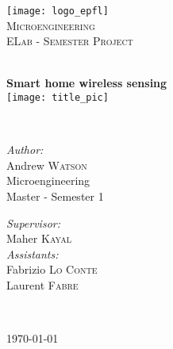 


\begin{titlepage}
\nocite{*}      %
  \begin{center}
     
     
    \texttt{[image: logo\_epfl]}\\[1.5cm]
     
    \textsc{\LARGE Microengineering }\\[1.0cm]

    \textsc{\Large ELab - Semester Project}\\[0.1cm]

    \vfill 
     
    \HRule \\[0.7cm]
    { \huge \bfseries Smart home wireless sensing}\\[0.4cm]

    \texttt{[image: title\_pic]} 
     
    \HRule \\[2.0cm]
     
    \begin{minipage}{0.4\textwidth}
      \begin{flushleft} \large
        \emph{Author:} \\
        Andrew \textsc{Watson}\\[0.8cm]

        Microengineering\\
        Master - Semester 1\\[0.5cm]
      \end{flushleft}
    \end{minipage}
    \begin{minipage}{0.4\textwidth}
      \begin{flushright} \large
        \emph{Supervisor:} \\
        Maher \textsc{Kayal}\\[0.5cm]

        \emph{Assistants:} \\
        Fabrizio \textsc{Lo Conte}\\
        Laurent \textsc{Fabre}\\[0.5cm]
      \end{flushright}
    \end{minipage} \\[2cm]
     
    \vfill
     
    {\large \today}
     
  \end{center}

\end{titlepage}
